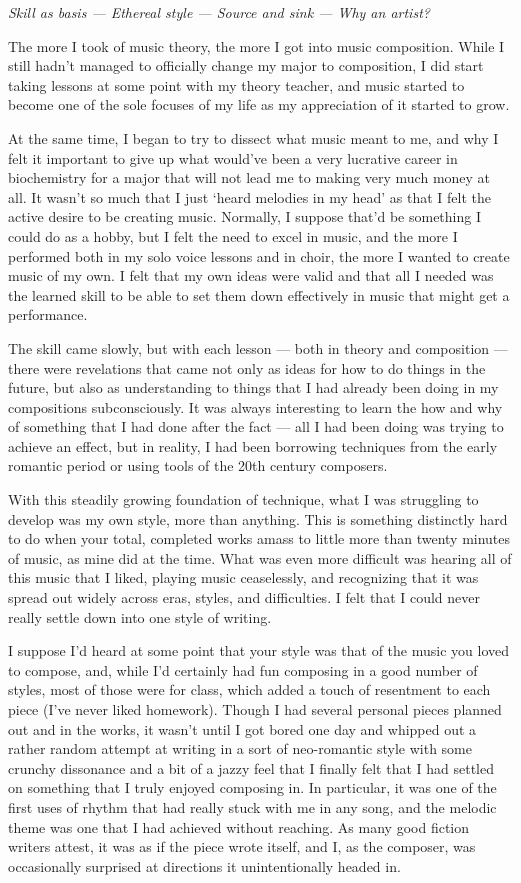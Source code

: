 \emph{Skill as basis --- Ethereal style --- Source and sink --- Why an artist?}

The more I took of music theory, the more I got into music composition. While I still hadn't managed to officially change my major to composition, I did start taking lessons at some point with my theory teacher, and music started to become one of the sole focuses of my life as my appreciation of it started to grow.

At the same time, I began to try to dissect what music meant to me, and why I felt it important to give up what would've been a very lucrative career in biochemistry for a major that will not lead me to making very much money at all. It wasn't so much that I just `heard melodies in my head' as that I felt the active desire to be creating music. Normally, I suppose that'd be something I could do as a hobby, but I felt the need to excel in music, and the more I performed both in my solo voice lessons and in choir, the more I wanted to create music of my own. I felt that my own ideas were valid and that all I needed was the learned skill to be able to set them down effectively in music that might get a performance.

The skill came slowly, but with each lesson --- both in theory and composition --- there were revelations that came not only as ideas for how to do things in the future, but also as understanding to things that I had already been doing in my compositions subconsciously. It was always interesting to learn the how and why of something that I had done after the fact --- all I had been doing was trying to achieve an effect, but in reality, I had been borrowing techniques from the early romantic period or using tools of the 20th century composers.

With this steadily growing foundation of technique, what I was struggling to develop was my own style, more than anything. This is something distinctly hard to do when your total, completed works amass to little more than twenty minutes of music, as mine did at the time. What was even more difficult was hearing all of this music that I liked, playing music ceaselessly, and recognizing that it was spread out widely across eras, styles, and difficulties. I felt that I could never really settle down into one style of writing.

I suppose I'd heard at some point that your style was that of the music you loved to compose, and, while I'd certainly had fun composing in a good number of styles, most of those were for class, which added a touch of resentment to each piece (I've never liked homework). Though I had several personal pieces planned out and in the works, it wasn't until I got bored one day and whipped out a rather random attempt at writing in a sort of neo-romantic style with some crunchy dissonance and a bit of a jazzy feel that I finally felt that I had settled on something that I truly enjoyed composing in. In particular, it was one of the first uses of rhythm that had really stuck with me in any song, and the melodic theme was one that I had achieved without reaching. As many good fiction writers attest, it was as if the piece wrote itself, and I, as the composer, was occasionally surprised at directions it unintentionally headed in.

